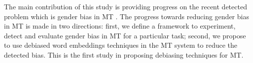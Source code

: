 \documentclass[11pt,a4paper]{article}
\begin{document}









The main contribution of this study is providing progress on the recent detected problem which is gender bias in MT \cite{prates:2018}. The progress towards reducing gender bias in MT is made in two directions: first, we define a framework to experiment, detect and evaluate gender bias in MT for a particular task; second, we propose to use debiased word embeddings techniques in the MT system to reduce the detected bias. This is the first study in proposing debiasing techniques for MT.
\end{document}
